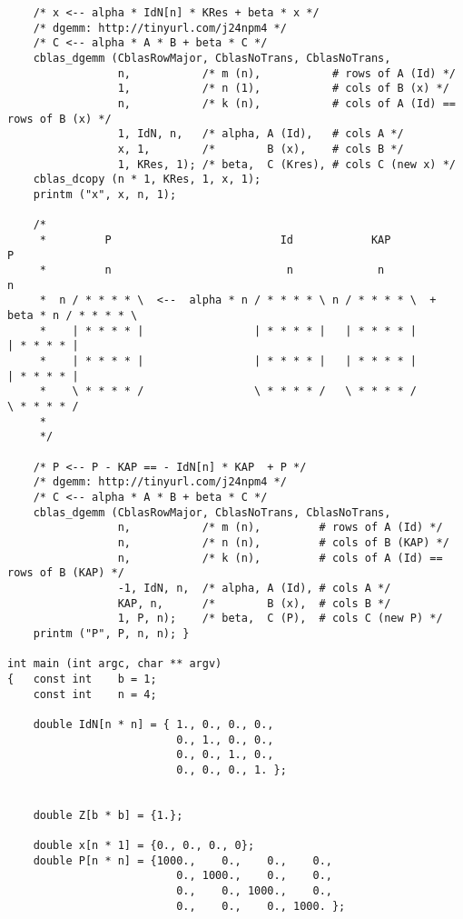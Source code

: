 \documentclass[10pt,oneside,x11names]{article}
\begin{document}
\begin{verbatim}
    /* x <-- alpha * IdN[n] * KRes + beta * x */
    /* dgemm: http://tinyurl.com/j24npm4 */
    /* C <-- alpha * A * B + beta * C */
    cblas_dgemm (CblasRowMajor, CblasNoTrans, CblasNoTrans,
                 n,           /* m (n),           # rows of A (Id) */
                 1,           /* n (1),           # cols of B (x) */
                 n,           /* k (n),           # cols of A (Id) == rows of B (x) */
                 1, IdN, n,   /* alpha, A (Id),   # cols A */
                 x, 1,        /*        B (x),    # cols B */
                 1, KRes, 1); /* beta,  C (Kres), # cols C (new x) */
    cblas_dcopy (n * 1, KRes, 1, x, 1);
    printm ("x", x, n, 1);

    /*
     *         P                          Id            KAP                       P
     *         n                           n             n                        n
     *  n / * * * * \  <--  alpha * n / * * * * \ n / * * * * \  +  beta * n / * * * * \
     *    | * * * * |                 | * * * * |   | * * * * |              | * * * * |
     *    | * * * * |                 | * * * * |   | * * * * |              | * * * * |
     *    \ * * * * /                 \ * * * * /   \ * * * * /              \ * * * * /
     *
     */

    /* P <-- P - KAP == - IdN[n] * KAP  + P */
    /* dgemm: http://tinyurl.com/j24npm4 */
    /* C <-- alpha * A * B + beta * C */
    cblas_dgemm (CblasRowMajor, CblasNoTrans, CblasNoTrans,
                 n,           /* m (n),         # rows of A (Id) */
                 n,           /* n (n),         # cols of B (KAP) */
                 n,           /* k (n),         # cols of A (Id) == rows of B (KAP) */
                 -1, IdN, n,  /* alpha, A (Id), # cols A */
                 KAP, n,      /*        B (x),  # cols B */
                 1, P, n);    /* beta,  C (P),  # cols C (new P) */
    printm ("P", P, n, n); }

int main (int argc, char ** argv)
{   const int    b = 1;
    const int    n = 4;

    double IdN[n * n] = { 1., 0., 0., 0.,
                          0., 1., 0., 0.,
                          0., 0., 1., 0.,
                          0., 0., 0., 1. };


    double Z[b * b] = {1.};

    double x[n * 1] = {0., 0., 0., 0};
    double P[n * n] = {1000.,    0.,    0.,    0.,
                          0., 1000.,    0.,    0.,
                          0.,    0., 1000.,    0.,
                          0.,    0.,    0., 1000. };


\end{verbatim}
\end{document}
